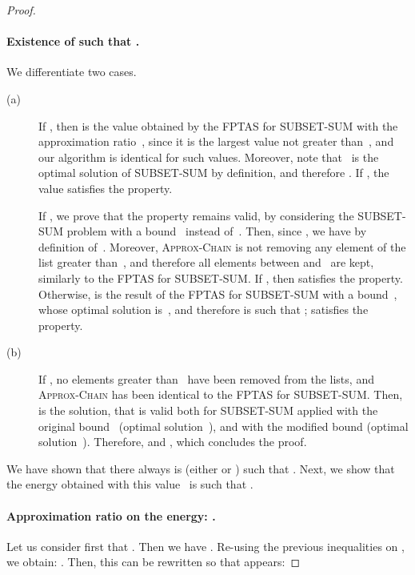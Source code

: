 \documentclass[a4paper]{article}
\theoremstyle{plain}
\theoremstyle{definition}
\theoremstyle{remark}
\newcommand{\approxchain}{\textsc{Ap\-prox-Chain}}
\begin{document}
\begin{proof}
\paragraph{Existence of  such that . }
We differentiate two cases. 

\begin{description}
\item[(a)] If , then  is the value obtained by the FPTAS
  for SUBSET-SUM \cite{cormen} with the approximation
  ratio~, since it is the largest value not greater
  than~, and our algorithm is identical for such values.  Moreover,
  note that ~is the optimal solution of SUBSET-SUM by definition,
  and therefore .  If , the
  value  satisfies the property.  

  If , we prove that the property remains valid, by
  considering the SUBSET-SUM problem with a bound~ instead
  of~. Then, since , we have  by definition
  of~. Moreover, \approxchain\xspace is not removing any element
  of the list greater than~, and therefore all elements between
   and~ are kept, similarly to the FPTAS for SUBSET-SUM. 
  If , then  satisfies the property. Otherwise,
   is the result of the FPTAS for SUBSET-SUM with a bound~,
  whose optimal solution is~, and therefore  is such that 
  ;  satisfies the
  property.  



\item[(b)] If , no elements greater than~ have been
  removed from the lists, and \approxchain\xspace has been identical
  to the FPTAS for SUBSET-SUM. Then,  is the solution, that
  is valid both for SUBSET-SUM applied with the original bound~
  (optimal solution~), and with the modified bound  (optimal
  solution~). Therefore,  and , which concludes the proof. 
\end{description}

We have shown that there always is  (either  or ) such
that .  Next, we show that the
energy  obtained with this value~ is such that
. 


\paragraph{Approximation ratio on the energy:  .} 



Let us consider first that . Then we have 
.  
Re-using the previous inequalities on , we obtain: 
. 
Then, this can be rewritten so that  appears: 




\end{proof}
\end{document}
